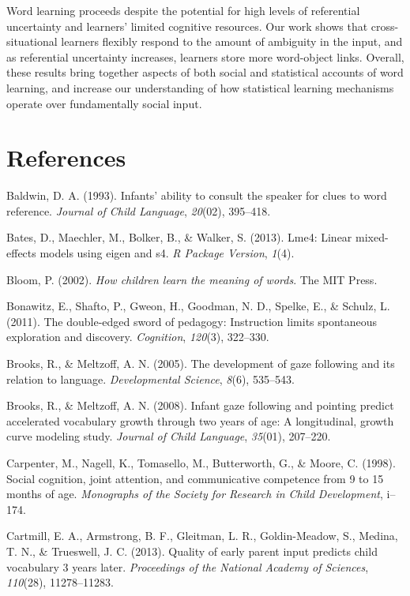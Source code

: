 \documentclass[authoryear, review]{elsarticle}
\begin{document}
Word learning proceeds despite the potential for high levels of
referential uncertainty and learners' limited cognitive resources. Our
work shows that cross-situational learners flexibly respond to the
amount of ambiguity in the input, and as referential uncertainty
increases, learners store more word-object links. Overall, these results
bring together aspects of both social and statistical accounts of word
learning, and increase our understanding of how statistical learning
mechanisms operate over fundamentally social input.

\newpage

\section*{References}\label{references}

Baldwin, D. A. (1993). Infants' ability to consult the speaker for clues
to word reference. \emph{Journal of Child Language}, \emph{20}(02),
395--418.

Bates, D., Maechler, M., Bolker, B., \& Walker, S. (2013). Lme4: Linear
mixed-effects models using eigen and s4. \emph{R Package Version},
\emph{1}(4).

Bloom, P. (2002). \emph{How children learn the meaning of words}. The
MIT Press.

Bonawitz, E., Shafto, P., Gweon, H., Goodman, N. D., Spelke, E., \&
Schulz, L. (2011). The double-edged sword of pedagogy: Instruction
limits spontaneous exploration and discovery. \emph{Cognition},
\emph{120}(3), 322--330.

Brooks, R., \& Meltzoff, A. N. (2005). The development of gaze following
and its relation to language. \emph{Developmental Science}, \emph{8}(6),
535--543.

Brooks, R., \& Meltzoff, A. N. (2008). Infant gaze following and
pointing predict accelerated vocabulary growth through two years of age:
A longitudinal, growth curve modeling study. \emph{Journal of Child
Language}, \emph{35}(01), 207--220.

Carpenter, M., Nagell, K., Tomasello, M., Butterworth, G., \& Moore, C.
(1998). Social cognition, joint attention, and communicative competence
from 9 to 15 months of age. \emph{Monographs of the Society for Research
in Child Development}, i--174.

Cartmill, E. A., Armstrong, B. F., Gleitman, L. R., Goldin-Meadow, S.,
Medina, T. N., \& Trueswell, J. C. (2013). Quality of early parent input
predicts child vocabulary 3 years later. \emph{Proceedings of the
National Academy of Sciences}, \emph{110}(28), 11278--11283.
\end{document}
